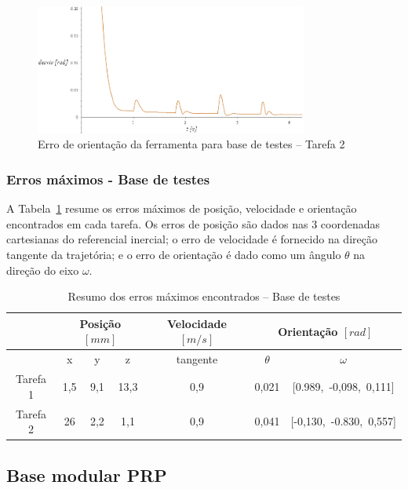 \begin{figure}[h!]
	\centering 
 	\includegraphics[width=0.80\textwidth]{figs/t2_erroori_base_testes}
 	\caption{Erro de orientação da ferramenta para base de testes -- Tarefa
 	2}
 	\label{fig::t2_erroori_base_testes}
\end{figure}


\subsubsection{Erros máximos - Base de testes}

A Tabela~\ref{tab::erros_base_testes} resume os erros máximos de posição,
velocidade e orientação encontrados em cada tarefa. Os erros de
posição são dados nas 3 coordenadas cartesianas do referencial inercial; o erro
de velocidade é fornecido na direção tangente da trajetória; e o erro de
orientação é dado como um ângulo $\theta$ na direção do eixo $\omega$.

\begin{table}[h!]
\centering
\caption{Resumo dos erros máximos encontrados -- Base de testes}
\label{tab::erros_base_testes}
\begin{tabular}{@{}ccccccc@{}}
\toprule
         & \multicolumn{3}{c}{\textbf{Posição $[mm]$}} & \textbf{Velocidade $[m/s]$} & \multicolumn{2}{c}{\textbf{Orientação $[rad]$}} 	\\ \midrule
         & x          & y          & z          & tangente            & $\theta$            & $\omega$         		\\
Tarefa 1 & 1,5    	  & 9,1        & 13,3       & 0,9                 &	0,021				& [0.989,~-0,098,~0,111]                  	\\
Tarefa 2 & 26     	  & 2,2 	   & 1,1        & 0,9                 & 0,041				& [-0,130,~-0.830,~0,557] \\ \bottomrule
\end{tabular}
\end{table}


\subsection{Base modular PRP} \label{sec::res_prp}

